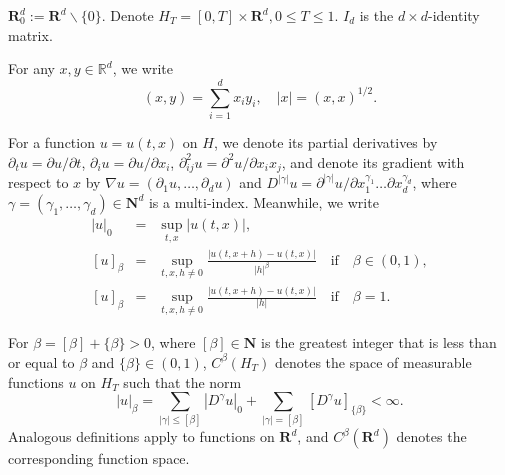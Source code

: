 \documentclass[11pt]{amsart}
\theoremstyle{plain}
\numberwithin{equation}{section}
\begin{document}
$\mathbf{R}_{0}^{d}:=\mathbf{R}^{d}\backslash \{0\}$. Denote $H_{T}=\left[
0,T\right] \times \mathbf{R}^{d},0\leq T\leq 1$. $I_{d}$ is the $d\times d$-identity matrix.

For any $x,y\in\mathbb{R}^d$, we write 
\begin{equation*}
\left(x,y\right)=\sum^d_{i=1}x_iy_i, \quad \left\vert
x\right\vert=\left(x,x\right)^{1/2}.
\end{equation*}

For a function $u=u\left( t,x\right) $ on $H$, we denote its partial
derivatives by $\partial _{t}u=\partial u/\partial t$, $\partial
_{i}u=\partial u/\partial x_{i}$, $\partial _{ij}^{2}u=\partial
^{2}u/\partial x_{i}x_{j}$, and denote its gradient with respect to $x$ by $\nabla u=\left( \partial _{1}u,\ldots ,\partial _{d}u\right) $ and $D^{|\gamma |}u=\partial ^{|\gamma |}u/\partial x_{1}^{\gamma _{1}}\ldots
\partial x_{d}^{\gamma _{d}}$, where $\gamma =\left( \gamma _{1},\ldots
,\gamma _{d}\right) \in \mathbf{N}^{d}$ is a multi-index. Meanwhile, we
write 
\begin{eqnarray*}
\left\vert u\right\vert _{0} &=&\sup_{t,x}\left\vert u\left( t,x\right)
\right\vert , \\
\left[ u\right] _{\beta } &=&\sup_{t,x,h\neq 0}\frac{\left\vert u\left(
t,x+h\right) -u\left( t,x\right) \right\vert }{\left\vert h\right\vert
^{\beta }}\quad \text{if}\quad \beta \in \left( 0,1\right) , \\
\left[ u\right] _{\beta } &=&\sup_{t,x,h\neq 0}\frac{\left\vert u\left(
t,x+h\right) -u\left( t,x\right) \right\vert }{\left\vert h\right\vert }\quad \text{if}\quad \beta =1.
\end{eqnarray*}

For $\beta =\left[ \beta \right] +\{\beta \}>0$, where $\left[ \beta \right]
\in \mathbf{N}$ is the greatest integer that is less than or equal to $\beta 
$ and $\{\beta \}\in \left( 0,1\right) $, $C^{\beta }\left( H_{T}\right) $
denotes the space of measurable functions $u$ on $H_{T}$ such that the norm 
\begin{equation*}
\left\vert u\right\vert _{\beta }=\sum_{\left\vert \gamma \right\vert \leq 
\left[ \beta \right] }\left\vert D^{\gamma }u\right\vert
_{0}+\sum_{\left\vert \gamma \right\vert =\left[ \beta \right] }\left[
D^{\gamma }u\right] _{\{\beta \}}<\infty .
\end{equation*}Analogous definitions apply to functions on $\mathbf{R}^{d}$, and $C^{\beta
}\left( \mathbf{R}^{d}\right) $ denotes the corresponding function space.
\end{document}
